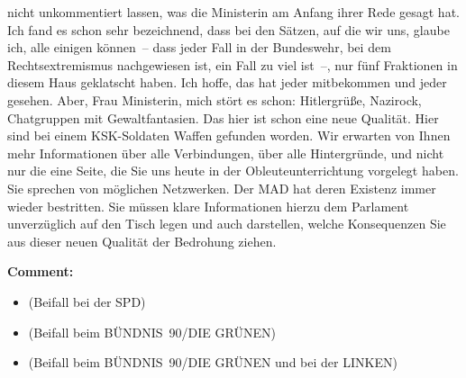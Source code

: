 \documentclass{article}
\begin{document}
nicht unkommentiert lassen, was die Ministerin am Anfang ihrer Rede gesagt hat. Ich fand es schon sehr bezeichnend, dass bei den Sätzen, auf die wir uns, glaube ich, alle einigen können – dass jeder Fall in der Bundeswehr, bei dem Rechtsextremismus nachgewiesen ist, ein Fall zu viel ist –, nur fünf Fraktionen in diesem Haus geklatscht haben. Ich hoffe, das hat jeder mitbekommen und jeder gesehen. Aber, Frau Ministerin, mich stört es schon: Hitlergrüße, Nazirock, Chatgruppen mit Gewaltfantasien. Das hier ist schon eine neue Qualität. Hier sind bei einem KSK-Soldaten Waffen gefunden worden. Wir erwarten von Ihnen mehr Informationen über alle Verbindungen, über alle Hintergründe, und nicht nur die eine Seite, die Sie uns heute in der Obleuteunterrichtung vorgelegt haben. Sie sprechen von möglichen Netzwerken. Der MAD hat deren Existenz immer wieder bestritten. Sie müssen klare Informationen hierzu dem Parlament unverzüglich auf den Tisch legen und auch darstellen, welche Konsequenzen Sie aus dieser neuen Qualität der Bedrohung ziehen.  

\noindent\textbf{Comment:}
\begin{itemize}
    \setlength\itemsep{-3pt}
    \item (Beifall bei der SPD)
    \setlength\itemsep{-3pt}
    \item (Beifall beim BÜNDNIS 90/DIE GRÜNEN)
    \setlength\itemsep{-3pt}
    \item (Beifall beim BÜNDNIS 90/DIE GRÜNEN und bei der LINKEN)
\end{itemize}
\end{document}
